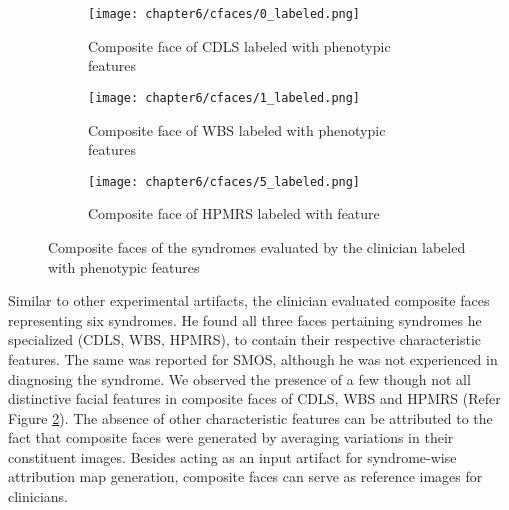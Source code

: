 \documentclass[../report.tex]{subfiles}
\begin{document}
\begin{figure}[H]
	\centering
	\begin{subfigure}[t]{0.8\textwidth}
		\centering
		\hspace{-0.5cm}
		\texttt{[image: chapter6/cfaces/0\_labeled.png]}
		\caption{Composite face of CDLS labeled with phenotypic features}
	\end{subfigure}
	\begin{subfigure}[t]{0.8\textwidth}
		\centering
		\texttt{[image: chapter6/cfaces/1\_labeled.png]}
		\caption{Composite face of WBS labeled with phenotypic features}
	\end{subfigure}
	\begin{subfigure}[t]{0.8\textwidth}
		\centering
		\texttt{[image: chapter6/cfaces/5\_labeled.png]}
		\caption{Composite face of HPMRS labeled with feature}
		\label{sfig_diff_3}
	\end{subfigure}
	\caption{Composite faces of the syndromes evaluated by the clinician labeled with phenotypic features}
	\label{fig_comp_lab}
\end{figure}
Similar to other experimental artifacts, the clinician evaluated composite faces representing six syndromes. He found all three faces pertaining syndromes he specialized (CDLS, WBS, HPMRS), to contain their respective characteristic features. The same was reported for SMOS, although he was not experienced in diagnosing the syndrome. We observed the presence of a few though not all distinctive facial features in composite faces of CDLS, WBS and HPMRS (Refer Figure \ref{fig_comp_lab}). The absence of other characteristic features can be attributed to the fact that composite faces were generated by averaging variations in their constituent images. Besides acting as an input artifact for syndrome-wise attribution map generation, composite faces can serve as reference images for clinicians.
\end{document}
